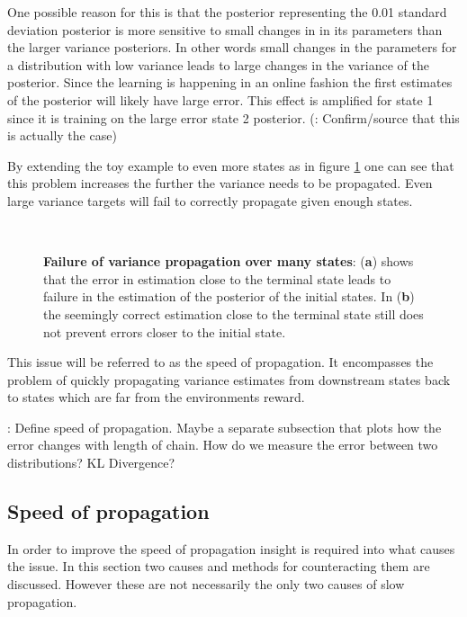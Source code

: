 One possible reason for this is that the posterior representing the 0.01 standard deviation posterior is more sensitive to small changes in in its parameters than the larger variance posteriors. In other words small changes in the parameters for a distribution with low variance leads to large changes in the variance of the posterior. Since the learning is happening in an online fashion the first estimates of the posterior will likely have large error. This effect is amplified for state 1 since it is training on the large error state 2 posterior. (\todo: Confirm/source that this is actually the case)

By extending the toy example to even more states as in figure \ref{fig:longproptest} one can see that this problem increases the further the variance needs to be propagated. Even large variance targets will fail to correctly propagate given enough states.

\begin{figure}[H]
    \centering
    \\
    \caption{\textbf{Failure of variance propagation over many states}: (\textbf{a}) shows that the error in estimation close to the terminal state leads to failure in the estimation of the posterior of the initial states. In (\textbf{b}) the seemingly correct estimation close to the terminal state still does not prevent errors closer to the initial state.}
    \label{fig:longproptest}
\end{figure}

This issue will be referred to as the speed of propagation. It encompasses the problem of quickly propagating variance estimates from downstream states back to states which are far from the environments reward.

\todo: Define speed of propagation. Maybe a separate subsection that plots how the error changes with length of chain. How do we measure the error between two distributions? KL Divergence?

\subsection{Speed of propagation}

In order to improve the speed of propagation insight is required into what causes the issue. In this section two causes and methods for counteracting them are discussed. However these are not necessarily the only two causes of slow propagation.

